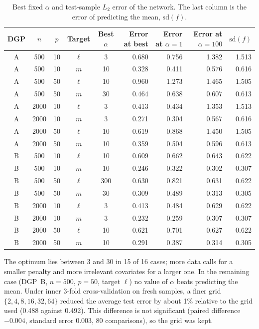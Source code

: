 \documentclass[11pt,a4paper]{article}
\begin{document}
\begin{table}[h]
\centering\small
\caption{Best fixed $\alpha$ and test-sample $L_2$ error of the network. The last column is the error of predicting the mean, $\mathrm{sd}(f)$.}\label{tab:alpha}
\begin{tabular}{cccccrrrr}
\toprule
DGP & $n$ & $p$ & Target & Best $\alpha$ & Error at best & Error at $\alpha=1$ & Error at $\alpha=100$ & $\mathrm{sd}(f)$\\
\midrule
A & 500 & 10 & $\ell$ & 3 & 0.680 & 0.756 & 1.382 & 1.513\\
A & 500 & 10 & $m$ & 10 & 0.328 & 0.411 & 0.576 & 0.616\\
A & 500 & 50 & $\ell$ & 10 & 0.960 & 1.273 & 1.465 & 1.505\\
A & 500 & 50 & $m$ & 30 & 0.464 & 0.638 & 0.607 & 0.613\\
A & 2000 & 10 & $\ell$ & 3 & 0.413 & 0.434 & 1.353 & 1.513\\
A & 2000 & 10 & $m$ & 3 & 0.271 & 0.304 & 0.567 & 0.616\\
A & 2000 & 50 & $\ell$ & 10 & 0.619 & 0.868 & 1.450 & 1.505\\
A & 2000 & 50 & $m$ & 10 & 0.359 & 0.504 & 0.596 & 0.613\\
B & 500 & 10 & $\ell$ & 10 & 0.609 & 0.662 & 0.643 & 0.622\\
B & 500 & 10 & $m$ & 10 & 0.246 & 0.322 & 0.302 & 0.307\\
B & 500 & 50 & $\ell$ & 300 & 0.630 & 0.821 & 0.631 & 0.622\\
B & 500 & 50 & $m$ & 30 & 0.309 & 0.489 & 0.313 & 0.305\\
B & 2000 & 10 & $\ell$ & 3 & 0.413 & 0.484 & 0.629 & 0.622\\
B & 2000 & 10 & $m$ & 3 & 0.232 & 0.259 & 0.307 & 0.307\\
B & 2000 & 50 & $\ell$ & 10 & 0.621 & 0.701 & 0.627 & 0.622\\
B & 2000 & 50 & $m$ & 10 & 0.291 & 0.387 & 0.314 & 0.305\\
\bottomrule
\end{tabular}
\end{table}

The optimum lies between 3 and 30 in 15 of 16 cases; more data calls for a smaller penalty and more irrelevant covariates for a larger one. In the remaining case (DGP~B, $n=500$, $p=50$, target $\ell$) no value of $\alpha$ beats predicting the mean. Under inner 3-fold cross-validation on fresh samples, a finer grid $\{2,4,8,16,32,64\}$ reduced the average test error by about 1\% relative to the grid used (0.488 against 0.492). This difference is not significant (paired difference $-0.004$, standard error 0.003, 80 comparisons), so the grid was kept.
\end{document}
